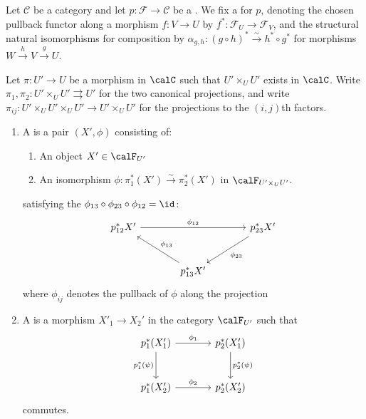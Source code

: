 \begin{definition} \label{definition:descent_datum_for_a_category_fibered_in_groupoids_over_a_category_relative_to_a_single_morphism}
    Let $\mathcal{C}$ be a category and let $p: \mathcal{F} \to \mathcal{C}$ be a . We fix a  for $p$, denoting the chosen pullback functor along a morphism $f: V \to U$ by $f^*: \mathcal{F}_U \to \mathcal{F}_V$, and the structural natural isomorphisms for composition by $\alpha_{g,h}: (g \circ h)^* \xrightarrow{\sim} h^* \circ g^*$ for morphisms $W \xrightarrow{h} V \xrightarrow{g} U$.

    Let $\pi: U' \to U$ be a morphism in $
    \calC$ such that $U' \times_U U'$  exists in $\calC$. 
    Write $\pi_1,\pi_2: U' \times_U U' \rightrightarrows U'$ for the two canonical projections, and write $\pi_{ij}: U' \times_U U' \times_U U' \to U' \times_U U'$ for the projections to the $(i,j)$th factors. 
    \begin{enumerate}
        \item A  is a pair $(X', \phi)$ consisting of: 
        \begin{enumerate}
            \item An object $X' \in \calF_{U'}$
            \item An isomorphism $\phi: \pi_1^*(X') \xrightarrow{\sim} \pi_2^*(X')$ in $\calF_{U' \times_U U'}$.
        \end{enumerate}
        satisfying the  $\phi_{13} \circ \phi_{23} \circ \phi_{12} = \id$:
        $$
        \begin{tikzcd}[row sep=large, column sep=large]
        p_{12}^* X' \arrow[rr, "\phi_{12}"] & & p_{23}^* X' \arrow[dl, "\phi_{23}"] \\
        & p_{13}^* X' \arrow[ul, "{\phi_{13}}"'] & 
        \end{tikzcd}
        $$
        where $\phi_{ij}$ denotes the pullback of $\phi$ along the projection 

        \item A  is a morphism $X'_1 \to X_2'$ in the category $\calF_{U'}$ such that 
        $$
        \begin{tikzcd}[row sep=large, column sep=large]
        p_1^*(X'_1) \arrow[r, "\phi_1"] \arrow[d, "p_1^*(\psi)"'] & p_2^*(X'_1) \arrow[d, "p_2^*(\psi)"] \\
        p_1^*(X'_2) \arrow[r, "\phi_2"] & p_2^*(X'_2)
        \end{tikzcd}
        $$
        commutes.


\end{enumerate}
\end{definition}
